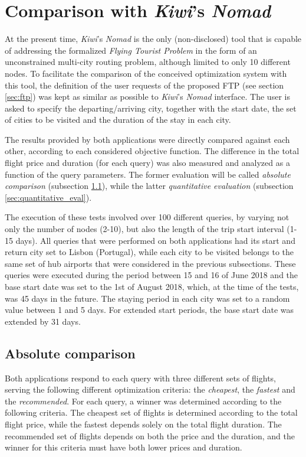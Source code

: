 \section{Comparison with \textit{Kiwi}'s \textit{Nomad}}
\label{sec:nomad}

At the present time, \textit{Kiwi}'s \textit{Nomad} is the only (non-disclosed) tool that is capable of addressing the formalized \textit{Flying Tourist Problem} in the form of an unconstrained multi-city routing problem, although limited to only 10 different nodes. To facilitate the comparison of the conceived optimization system with this tool, the definition of the user requests of the proposed FTP (see section \ref{sec:ftp}) was kept as similar as possible to \textit{Kiwi}'s \textit{Nomad} interface. The user is asked to specify the departing/arriving city, together with the start date, the set of cities to be visited and the duration of the stay in each city.

The results provided by both applications were directly compared against each other, according to each considered objective function. The difference in the total flight price and duration (for each query) was also measured and analyzed as a function of the query parameters. The former evaluation will be called \textit{absolute comparison} (subsection \ref{sec:absolute_eval}), while the latter \textit{quantitative evaluation} (subsection \ref{sec:quantitative_eval}).

The execution of these tests involved over 100 different queries, by varying not only the number of nodes (2-10), but also the length of the trip start interval (1-15 days). All queries that were performed on both applications had its start and return city set to Lisbon (Portugal), while each city to be visited belongs to the same set of hub airports that were considered in the previous subsections.  These queries were executed during the period between 15 and 16 of June 2018 and the base start date was set to the 1st of August 2018, which, at the time of the tests, was 45 days in the future. The staying period in each city was set to a random value between 1 and 5 days. For extended start periods, the base start date was extended by 31 days.


\subsection{Absolute comparison}
\label{sec:absolute_eval}

Both applications respond to each query with three different sets of flights, serving the following different optimization criteria: the \textit{cheapest}, the \textit{fastest} and the \textit{recommended}. For each query, a winner was determined according to the following criteria. The cheapest set of flights is determined according to the total flight price, while the fastest depends solely on the total flight duration. The recommended set of flights depends on both the price and the duration, and the winner for this criteria must have both lower prices and duration. 

